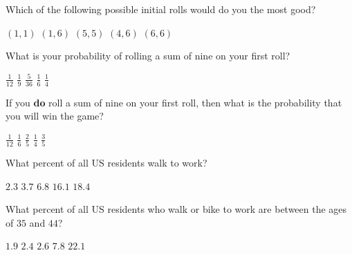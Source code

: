 \documentclass[answers,12pt]{exam}
\begin{document}
\begin{questions}
\question\label{FirstCraps}
Which of the following possible initial rolls
would do you the most good?\\
\begin{oneparchoices}
\choice $\left(1,1\right)$ %
\correctchoice $\left(1,6\right)$
\choice $\left(5,5\right)$
\choice $\left(4,6\right)$
\choice $\left(6,6\right)$ %
\end{oneparchoices}

\question\label{FirstCraps}
What is your probability of rolling a sum
of nine on your first roll?\\
\begin{oneparchoices}
\choice $\frac{1}{12}$ %
\correctchoice $\frac{1}{9}$
\choice $\frac{5}{36}$
\choice $\frac{1}{6}$
\choice $\frac{1}{4}$ %
\end{oneparchoices}

\question\label{LastCraps}
If you {\bf do} roll a sum of nine on your first roll,
then what is the probability that you will win the game?\\
\begin{oneparchoices}
\choice $\frac{1}{12}$ %
\choice $\frac{1}{6}$  %
\correctchoice $\frac{2}{5}$  %
\choice $\frac{1}{4}$  %
\choice $\frac{3}{5}$  %
\end{oneparchoices}


\question\label{FirstWalk}
What percent of all US residents walk to work?\\
\begin{oneparchoices}
\choice $2.3$ %
\choice $3.7$ %
\choice $6.8$ %
\choice $16.1$ %
\correctchoice $18.4$
\end{oneparchoices}

\question
What percent of all US residents who walk or bike to work
are between the ages of $35$ and $44$?\\
\begin{oneparchoices}
\choice $1.9$ %
\correctchoice $2.4$
\choice $2.6$ %
\choice $7.8$ %
\choice $22.1$ %
\end{oneparchoices}


\end{questions}
\end{document}
